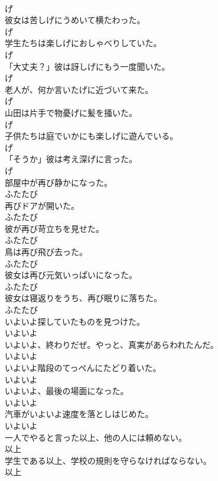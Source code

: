 \documentclass[8pt]{extreport}
\begin{document}
\begin{CJK}{UTF8}{min}
\\	げ
\\	彼女は苦しげにうめいて横たわった。	
\\	げ
\\	学生たちは楽しげにおしゃべりしていた。	
\\	げ
\\	「大丈夫？」彼は訝しげにもう一度聞いた。	
\\	げ
\\	老人が、何か言いたげに近づいて来た。	
\\	げ
\\	山田は片手で物憂げに髪を掻いた。	
\\	げ
\\	子供たちは庭でいかにも楽しげに遊んでいる。	
\\	げ
\\	「そうか」彼は考え深げに言った。	
\\	げ
\\	部屋中が再び静かになった。	
\\	ふたたび
\\	再びドアが開いた。	
\\	ふたたび
\\	彼が再び苛立ちを見せた。	
\\	ふたたび
\\	鳥は再び飛び去った。	
\\	ふたたび
\\	彼女は再び元気いっぱいになった。	
\\	ふたたび
\\	彼女は寝返りをうち、再び眠りに落ちた。	
\\	ふたたび
\\	いよいよ探していたものを見つけた。	
\\	いよいよ
\\	いよいよ、終わりだぜ。やっと、真実があらわれたんだ。	
\\	いよいよ
\\	いよいよ階段のてっぺんにたどり着いた。	
\\	いよいよ
\\	いよいよ、最後の場面になった。	
\\	いよいよ
\\	汽車がいよいよ速度を落としはじめた。	
\\	いよいよ
\\	一人でやると言った以上、他の人には頼めない。	
\\	以上
\\	学生である以上、学校の規則を守らなければならない。	
\\	以上

\end{CJK}
\end{document}
